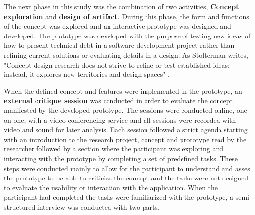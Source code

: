 The next phase in this study was the combination of two activities, \textbf{Concept exploration}  and \textbf{design of artifact}.
During this phase, the form and functions of the concept was explored and an interactive prototype was designed and developed.
The prototype was developed with the purpose of testing new ideas of how to present technical debt in a software development project rather than refining current solutions or evaluating details in a design.
As Stolterman writes, "Concept design research does not strive to refine or test established ideas; instead, it explores new territories and design spaces" \cite{stolterman_concept-driven_2010}.

When the defined concept and features were implemented in the prototype, an \textbf{external critique session} was conducted in order to evaluate the concept manifested by the developed prototype.
The sessions were conducted online, one-on-one, with a video conferencing service and all sessions were recorded with video and sound for later analysis.
Each session followed a strict agenda starting with an introduction to the research project, concept and prototype read by the researcher followed by a section where the participant was exploring and interacting with the prototype by completing a set of predefined tasks.
These steps were conducted mainly to allow for the participant to understand and asses the prototype to be able to criticize the concept and the tasks were not designed to evaluate the usability or interaction with the application.
When the participant had completed the tasks were familiarized with the prototype, a semi-structured interview was conducted with two parts.
